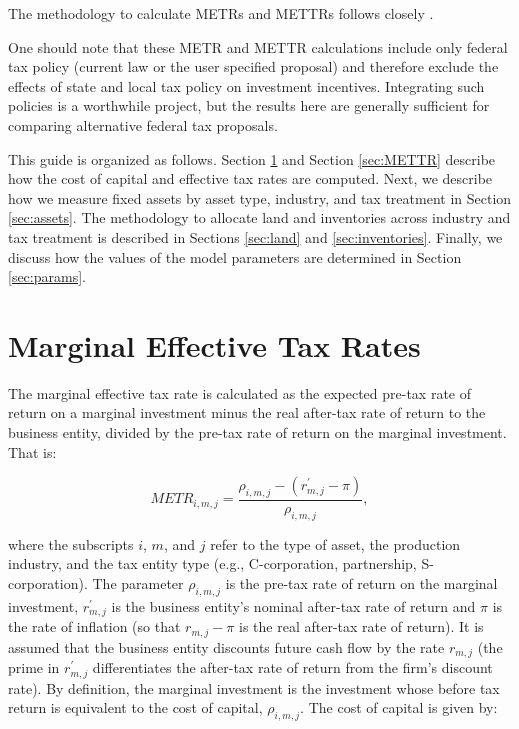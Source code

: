 \documentclass[article,11pt,letterpaper,fleqn]{article}
\theoremstyle{definition}
\numberwithin{equation}{section}
\newcommand{\cn}{\citeasnoun} %
\begin{document}
The methodology to calculate METRs and METTRs follows closely \cn{CBO_ETRs}.

One should note that these METR and METTR calculations include only federal tax policy (current law or the user specified proposal) and therefore exclude the effects of state and local tax policy on investment incentives.  Integrating such policies is a worthwhile project, but the results here are generally sufficient for comparing alternative federal tax proposals.


This guide is organized as follows.  Section \ref{sec:METR} and Section \ref{sec:METTR} describe how the cost of capital and effective tax rates are computed.  Next, we describe how we measure fixed assets by asset type, industry, and tax treatment in Section \ref{sec:assets}.  The methodology to allocate land and inventories across industry and tax treatment is described in Sections \ref{sec:land} and \ref{sec:inventories}.  Finally, we discuss how the values of the model parameters are determined in Section \ref{sec:params}.

\section{Marginal Effective Tax Rates}
\label{sec:METR}

The marginal effective tax rate is calculated as the expected pre-tax rate of return on a marginal investment minus the real after-tax rate of return to the business entity, divided by the pre-tax rate of return on the marginal investment.  That is: 

\begin{equation}
METR_{i,m,j} = \frac{\rho_{i,m,j} - (r^{'}_{m,j}-\pi)}{\rho_{i,m,j}},
\end{equation}

\noindent\noindent where the subscripts $i$, $m$, and $j$ refer to the type of asset, the production industry, and the tax entity type (e.g., C-corporation, partnership, S-corporation).  The parameter $\rho_{i,m,j}$ is the pre-tax rate of return on the marginal investment, $r^{'}_{m,j}$ is the business entity's nominal after-tax rate of return and $\pi$ is the rate of inflation (so that $r_{m,j}-\pi$ is the real after-tax rate of return).  It is assumed that the business entity discounts future cash flow by the rate $r_{m,j}$ (the prime in $r^{'}_{m,j}$ differentiates the after-tax rate of return from the firm's discount rate).  By definition, the marginal investment is the investment whose before tax return is equivalent to the cost of capital, $\rho_{i,m,j}$.  The cost of capital is given by:
\end{document}
